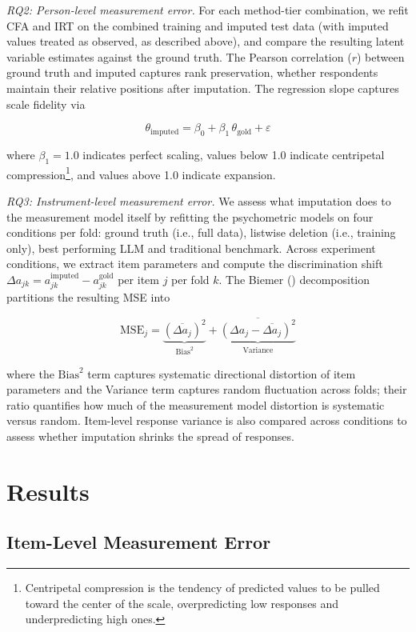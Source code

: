\documentclass[
  man,
  floatsintext,
  longtable,
  nolmodern,
  notxfonts,
  notimes,
  colorlinks=true,linkcolor=blue,citecolor=blue,urlcolor=blue]{apa7}
\begin{document}
\emph{RQ2: Person-level measurement error.} For each method-tier
combination, we refit CFA and IRT on the combined training and imputed
test data (with imputed values treated as observed, as described above),
and compare the resulting latent variable estimates against the ground
truth. The Pearson correlation (\(r\)) between ground truth and imputed
captures rank preservation, whether respondents maintain their relative
positions after imputation. The regression slope captures scale fidelity
via

\[\theta_{\text{imputed}} = \beta_0 + \beta_1 \, \theta_{\text{gold}} + \varepsilon\]

where \(\beta_1 = 1.0\) indicates perfect scaling, values below 1.0
indicate centripetal compression\footnote{Centripetal compression is the
  tendency of predicted values to be pulled toward the center of the
  scale, overpredicting low responses and underpredicting high ones.},
and values above 1.0 indicate expansion.

\emph{RQ3: Instrument-level measurement error.} We assess what
imputation does to the measurement model itself by refitting the
psychometric models on four conditions per fold: ground truth (i.e.,
full data), listwise deletion (i.e., training only), best performing LLM
and traditional benchmark. Across experiment conditions, we extract item
parameters and compute the discrimination shift
\(\Delta a_{jk} = a_{jk}^{\text{imputed}} - a_{jk}^{\text{gold}}\) per
item \(j\) per fold \(k\). The Biemer ()
decomposition partitions the resulting MSE into

\[\text{MSE}_j = \underbrace{\left(\overline{\Delta a_j}\right)^2}_{\text{Bias}^2} + \underbrace{\overline{\left(\Delta a_j - \overline{\Delta a_j}\right)^2}}_{\text{Variance}}\]

where the \(\text{Bias}^2\) term captures systematic directional
distortion of item parameters and the Variance term captures random
fluctuation across folds; their ratio quantifies how much of the
measurement model distortion is systematic versus random. Item-level
response variance is also compared across conditions to assess whether
imputation shrinks the spread of responses.

\section{Results}\label{results}

\subsection{Item-Level Measurement
Error}\label{item-level-measurement-error}
\end{document}
